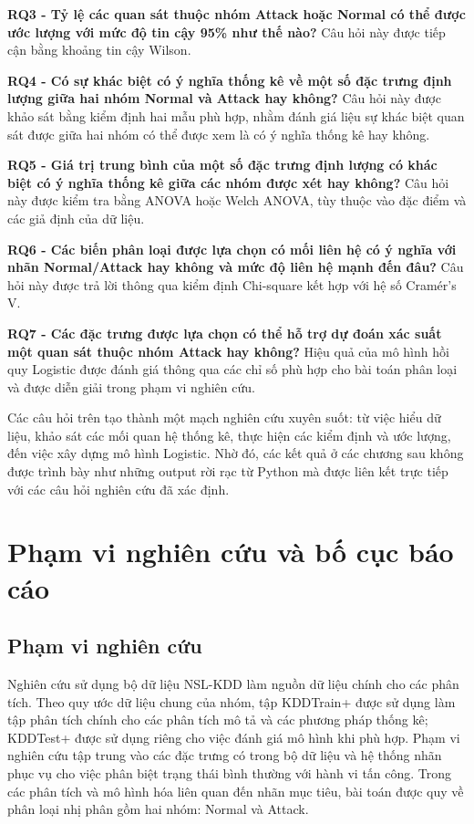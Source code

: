 \documentclass[../main.tex]{subfiles}
\begin{document}
\textbf{RQ3 - Tỷ lệ các quan sát thuộc nhóm Attack hoặc Normal có thể được ước lượng với mức độ tin cậy 95\% như thế nào?} Câu hỏi này được tiếp cận bằng khoảng tin cậy Wilson.

\textbf{RQ4 - Có sự khác biệt có ý nghĩa thống kê về một số đặc trưng định lượng giữa hai nhóm Normal và Attack hay không?} Câu hỏi này được khảo sát bằng kiểm định hai mẫu phù hợp, nhằm đánh giá liệu sự khác biệt quan sát được giữa hai nhóm có thể được xem là có ý nghĩa thống kê hay không.

\textbf{RQ5 - Giá trị trung bình của một số đặc trưng định lượng có khác biệt có ý nghĩa thống kê giữa các nhóm được xét hay không?} Câu hỏi này được kiểm tra bằng ANOVA hoặc Welch ANOVA, tùy thuộc vào đặc điểm và các giả định của dữ liệu.

\textbf{RQ6 - Các biến phân loại được lựa chọn có mối liên hệ có ý nghĩa với nhãn Normal/Attack hay không và mức độ liên hệ mạnh đến đâu?} Câu hỏi này được trả lời thông qua kiểm định Chi-square kết hợp với hệ số Cramér's V.

\textbf{RQ7 - Các đặc trưng được lựa chọn có thể hỗ trợ dự đoán xác suất một quan sát thuộc nhóm Attack hay không?} Hiệu quả của mô hình hồi quy Logistic được đánh giá thông qua các chỉ số phù hợp cho bài toán phân loại và được diễn giải trong phạm vi nghiên cứu.

Các câu hỏi trên tạo thành một mạch nghiên cứu xuyên suốt: từ việc hiểu dữ liệu, khảo sát các mối quan hệ thống kê, thực hiện các kiểm định và ước lượng, đến việc xây dựng mô hình Logistic. Nhờ đó, các kết quả ở các chương sau không được trình bày như những output rời rạc từ Python mà được liên kết trực tiếp với các câu hỏi nghiên cứu đã xác định.

\section{Phạm vi nghiên cứu và bố cục báo cáo}

\subsection{Phạm vi nghiên cứu}

Nghiên cứu sử dụng bộ dữ liệu NSL-KDD làm nguồn dữ liệu chính cho các phân tích. Theo quy ước dữ liệu chung của nhóm, tập KDDTrain+ được sử dụng làm tập phân tích chính cho các phân tích mô tả và các phương pháp thống kê; KDDTest+ được sử dụng riêng cho việc đánh giá mô hình khi phù hợp. Phạm vi nghiên cứu tập trung vào các đặc trưng có trong bộ dữ liệu và hệ thống nhãn phục vụ cho việc phân biệt trạng thái bình thường với hành vi tấn công. Trong các phân tích và mô hình hóa liên quan đến nhãn mục tiêu, bài toán được quy về phân loại nhị phân gồm hai nhóm: Normal và Attack.
\end{document}
